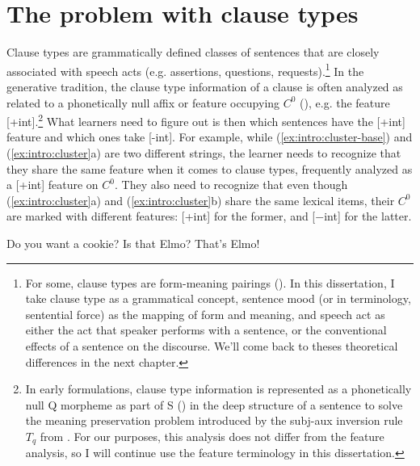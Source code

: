 \section{The problem with clause types}

Clause types are grammatically defined classes of sentences that are closely associated with speech acts (e.g. assertions, questions, requests).\footnote{For some, clause types are form-meaning pairings (\cite{sz1985speechact, ginzburgsag2000interrogative}). In this dissertation, I take clause type as a grammatical concept, sentence mood (or in \textcite['s]{chierchia1990textbook} terminology, sentential force) as the mapping of form and meaning, and speech act as either the act that speaker performs with a sentence, or the conventional effects of a sentence on the discourse. We'll come back to theses theoretical differences in the next chapter.} In the generative tradition, the clause type information of a clause is often analyzed as related to a phonetically null affix or feature occupying $C^{0}$ (\cite{chomsky1995minimalist, cheng1991, rizzi1997, rizzi2001int, chomskylasnik1977,platzack1997imp,akmajian1984clausetype, han1998imp}), e.g. the feature [+int].\footnote{In early formulations, clause type information is represented as a phonetically null Q morpheme as part of S (\cite{katzpostal1964, baker1970int}) in the deep structure of a sentence to solve the meaning preservation problem introduced by the subj-aux inversion rule $T_{q}$ from \textcite{chomsky1957}. For our purposes, this analysis does not differ from the feature analysis, so I will continue use the feature terminology in this dissertation.} What learners need to figure out is then which sentences have the [+int] feature and which ones take [-int]. For example, while (\ref{ex:intro:cluster-base}) and (\ref{ex:intro:cluster}a) are two different strings, the learner needs to recognize that they share the same feature when it comes to clause types, frequently analyzed as a [+int] feature on $C^{0}$. They also need to recognize that even though (\ref{ex:intro:cluster}a) and (\ref{ex:intro:cluster}b) share the same lexical items, their $C^{0}$ are marked with different features: [+int] for the former, and [$-$int] for the latter.


Do you want a cookie?
\eex
{}
\bxl{}
Is that Elmo?
\ex
That’s Elmo!
\exl
\eex


